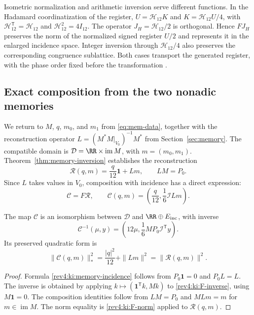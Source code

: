 Isometric normalization and arithmetic inversion serve different
functions. In the Hadamard coordinatization of the register,
\(U=\mathcal H_{12}K\) and
\(K=\mathcal H_{12}U/4\), with
\(\mathcal H_{12}^{\mathsf T}=\mathcal H_{12}\) and
\(\mathcal H_{12}^2=4I_{12}\).
The operator \(J_H=\mathcal H_{12}/2\) is orthogonal. Hence
\(FJ_H\) preserves the norm of the normalized signed register
\(U/2\) and represents it in the enlarged incidence space.
Integer inversion through \(\mathcal H_{12}/4\) also preserves
the corresponding congruence sublattice. Both cases transport the
generated register, with the phase order fixed before the
transformation \cite{hmtX}.

\subsection{Exact composition from the two nonadic memories}
\label{rev4:ki:memory-subsection}

We return to \(M\), \(q\), \(m_0\), and \(m_1\) from
\eqref{eq:mem-data}, together with the reconstruction operator
\(L=(M^*M|_{V_0})^{-1}M^*\) from Section~\ref{sec:memory}.
The compatible domain is
\(\mathcal D=\RR\times\operatorname{im}M\), with
\(m=(m_0,m_1)\). Theorem~\ref{thm:memory-inversion} establishes
the reconstruction
\[
 \mathcal R(q,m)=\frac q{12}\mathbf1+Lm,
 \qquad LM=P_0.
\]
Since \(L\) takes values in \(V_0\), composition with incidence
has a direct expression:
\begin{equation}
 \mathcal C=F\mathcal R,\qquad
 \mathcal C(q,m)=\left(\frac q{12},\frac16\mathcal I Lm\right).
 \label{rev4:ki:memory-incidence}
\end{equation}

\begin{corollary}
\label{rev4:ki:composition}
The map \(\mathcal C\) is an isomorphism between
\(\mathcal D\) and \(\RR\oplus E_{\rm inc}\), with inverse
\begin{equation}
 \mathcal C^{-1}(\mu,y)=
 \left(12\mu,\frac16MP_0\mathcal I^{\mathsf T}y\right).
 \label{rev4:ki:C-inverse}
\end{equation}
Its preserved quadratic form is
\[
 \|\mathcal C(q,m)\|_*^2=
 \frac{|q|^2}{12}+\|Lm\|^2=\|\mathcal R(q,m)\|^2.
\]
\end{corollary}
\begin{proof}
Formula \eqref{rev4:ki:memory-incidence} follows from
\(P_0\mathbf1=0\) and \(P_0L=L\). The inverse is obtained by
applying \(k\mapsto(\mathbf1^{\mathsf T}k,Mk)\) to
\eqref{rev4:ki:F-inverse}, using \(M\mathbf1=0\).
The composition identities follow from \(LM=P_0\) and
\(MLm=m\) for \(m\in\operatorname{im}M\). The norm equality
is \eqref{rev4:ki:F-norm} applied to \(\mathcal R(q,m)\).
\end{proof}

